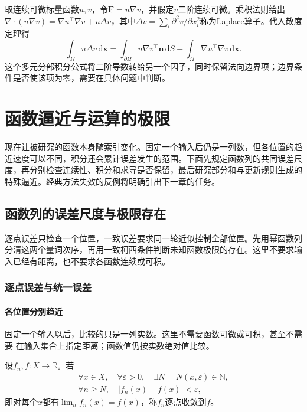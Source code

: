 取连续可微标量函数$u,v$，令$\bm F=u\nabla v$，并假定$v$二阶连续可微。乘积法则给出$\nabla\mathbin\cdot(u\nabla v)=\nabla u^\top\nabla v+u\Delta v$，其中$\Delta v=\sum_i\partial^2v/\partial x_i^2$称为Laplace算子。代入散度定理得
\[
 \int_\Omega u\Delta v\,\mathrm d\bm x
 =\int_{\partial\Omega}u\nabla v^\top\bm n\,\mathrm dS
  -\int_\Omega\nabla u^\top\nabla v\,\mathrm d\bm x.
\]
这个多元分部积分公式将二阶导数转给另一个因子，同时保留法向边界项；边界条件是否使该项为零，需要在具体问题中判断。

\section{函数逼近与运算的极限}
\label{sec:analysis-function-convergence-essential-bounds}

现在让被研究的函数本身随索引变化。固定一个输入后仍是一列数，但各位置的趋近速度可以不同，积分还会累计误差发生的范围。下面先规定函数列的共同误差尺度，再分别检查连续性、积分和求导是否保留，最后研究部分和与更新规则生成的特殊逼近。经典方法失效的反例将明确引出下一章的任务。

\subsection{函数列的误差尺度与极限存在}

逐点误差只检查一个位置，一致误差要求同一轮近似控制全部位置。先用幂函数列分清这两个量词次序，再用一致柯西条件判断未知函数极限的存在。这里不要求输入已经有距离，也不要求各函数连续或可积。

\subsubsection{逐点误差与统一误差}

\paragraph{各位置分别趋近}

固定一个输入以后，比较的只是一列实数。这里不需要函数可微或可积，甚至不需要
在输入集合上指定距离；函数值仍按实数绝对值比较。
\begin{definition}[逐点收敛]
\label{def:analysis-pointwise-almost-everywhere-convergence}
设$f_n,f:X\to\mathbb{R}$。若
\[
 \begin{gathered}
  \forall x\in X,\quad
  \forall\varepsilon>0,\quad
  \exists N=N(x,\varepsilon)\in\mathbb N,\\
  \forall n\geq N,\quad
  |f_n(x)-f(x)|<\varepsilon,
 \end{gathered}
\]
即对每个$x$都有$\lim_n f_n(x)=f(x)$，称$f_n$逐点收敛到$f$。
\end{definition}


